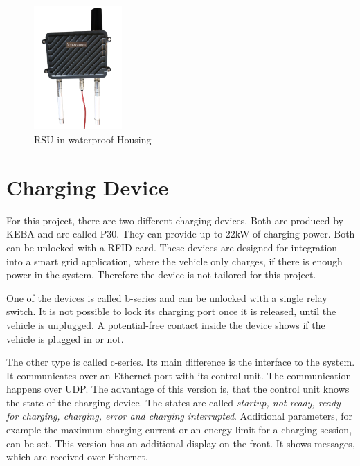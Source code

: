 \begin{figure}[htb]
	\centering
	\includegraphics [width=0.3\textwidth] {images/RSU}
	\caption{RSU in waterproof Housing}
	\label{fig:RSU}
\end{figure}


\section{Charging Device}\label{sec:chargingDevices}

For this project, there are two different charging devices. Both are produced by KEBA and are called P30. They can provide up to 22\;kW of charging power. Both can be unlocked with a RFID card. These devices are designed for integration into a smart grid application, where the vehicle only charges, if there is enough power in the system. Therefore the device is not tailored for this project.

One of the devices is called b-series and can be unlocked with a single relay switch. It is not possible to lock its charging port once it is released, until the vehicle is unplugged. A potential-free contact inside the device shows if the vehicle is plugged in or not. 

The other type is called c-series. Its main difference is the interface to the system. It communicates over an Ethernet port with its control unit. The communication happens over UDP. The advantage of this version is, that the control unit knows the state of the charging device. The states are called  \textit{startup, not ready, ready for charging, charging, error and charging interrupted}. Additional parameters, for example the maximum charging current or an energy limit for a charging session, can be set. This version has an additional display on the front. It shows messages, which are received over Ethernet.
\cite{KEBAP30_Datasheet} \cite{KEBAP30_Comparisonsheet} \cite{KEBAP30_UDP_Programmers_Guide}


